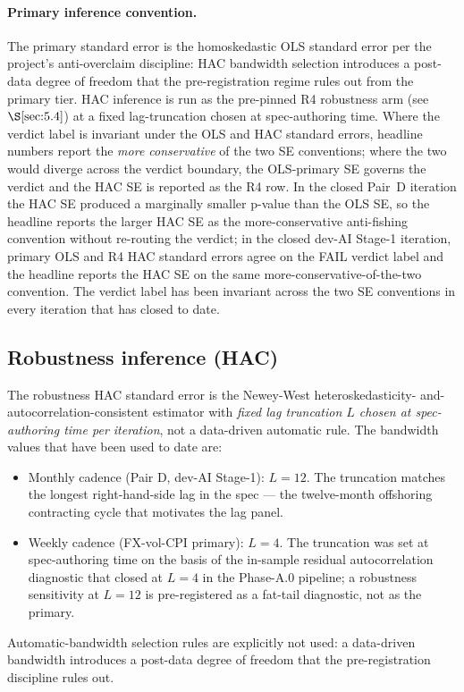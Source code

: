 \paragraph{Primary inference convention.} The primary standard error is
the homoskedastic OLS standard error per the project's anti-overclaim
discipline: HAC bandwidth selection introduces a post-data degree of
freedom that the pre-registration regime rules out from the primary tier.
HAC inference is run as the pre-pinned R4 robustness arm (see
\(\S\ref{sec:5.4}\)) at a fixed lag-truncation chosen at spec-authoring
time. Where the verdict label is invariant under the OLS and HAC standard
errors, headline numbers report the \emph{more conservative} of the two
SE conventions; where the two would diverge across the verdict boundary,
the OLS-primary SE governs the verdict and the HAC SE is reported as the
R4 row. In the closed Pair~D iteration the HAC SE produced a marginally
smaller p-value than the OLS SE, so the headline reports the larger HAC
SE as the more-conservative anti-fishing convention without re-routing
the verdict; in the closed dev-AI Stage-1 iteration, primary OLS and R4
HAC standard errors agree on the FAIL verdict label and the headline
reports the HAC SE on the same more-conservative-of-the-two convention.
The verdict label has been invariant across the two SE conventions in
every iteration that has closed to date.

\subsection{Robustness inference (HAC)}\label{sec:5.4}

The robustness HAC standard error is the Newey-West heteroskedasticity-
and-autocorrelation-consistent estimator \citep{neweywest1987} with
\emph{fixed lag truncation \(L\) chosen at spec-authoring time per
iteration}, not a data-driven automatic rule. The bandwidth values that
have been used to date are:
\begin{itemize}
  \item Monthly cadence (Pair D, dev-AI Stage-1): \(L = 12\). The
    truncation matches the longest right-hand-side lag in the spec --- the
    twelve-month offshoring contracting cycle that motivates the lag panel.
  \item Weekly cadence (FX-vol-CPI primary): \(L = 4\). The truncation was
    set at spec-authoring time on the basis of the in-sample residual
    autocorrelation diagnostic that closed at \(L = 4\) in the
    Phase-A.0 pipeline; a robustness sensitivity at \(L = 12\) is
    pre-registered as a fat-tail diagnostic, not as the primary.
\end{itemize}
Automatic-bandwidth selection rules \citep{neweywest1994, andrews1991}
are explicitly not used: a data-driven bandwidth introduces a post-data
degree of freedom that the pre-registration discipline rules out.


